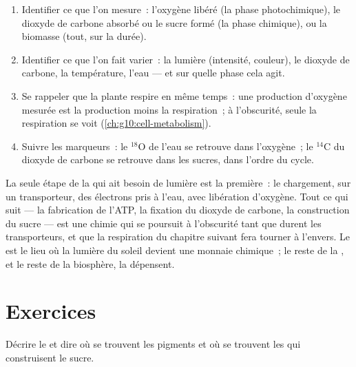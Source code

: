 \begin{method}\label{met:g12:photosynthesis:experiment}
\begin{enumerate}
  \item Identifier ce que l'on mesure~: l'oxygène libéré (la phase
        photochimique), le dioxyde de carbone absorbé ou le sucre
        formé (la phase chimique), ou la biomasse (tout, sur la
        durée).
  \item Identifier ce que l'on fait varier~: la lumière (intensité,
        couleur), le dioxyde de carbone, la température, l'eau --- et
        sur quelle phase cela agit.
  \item Se rappeler que la plante respire en même temps~: une
        production d'oxygène mesurée est la production moins la
        respiration~; à l'obscurité, seule la respiration se voit
        (\cref{ch:g10:cell-metabolism}).
  \item Suivre les marqueurs~: le $^{18}$O de l'eau se retrouve dans
        l'oxygène~; le $^{14}$C du dioxyde de carbone se retrouve dans
        les sucres, dans l'ordre du cycle.
\end{enumerate}
\end{method}

\begin{remark}\label{rem:g12:photosynthesis:light}
La seule étape de la  qui ait besoin de lumière est la
première~: le chargement, sur un transporteur, des électrons pris à
l'eau, avec libération d'oxygène. Tout ce qui suit --- la fabrication
de l'ATP, la fixation du dioxyde de carbone, la construction du
sucre --- est une chimie qui se poursuit à l'obscurité tant que durent
les transporteurs, et que la respiration du chapitre suivant fera
tourner à l'envers. Le  est le lieu où la lumière du
soleil devient une monnaie chimique~; le reste de la , et le
reste de la biosphère, la dépensent.
\end{remark}

\section{Exercices}

\begin{exercise}[$\star$]\label{exo:g12:photosynthesis:1}
Décrire le  et dire où se trouvent les pigments et où se
trouvent les  qui construisent le sucre.
\end{exercise}

